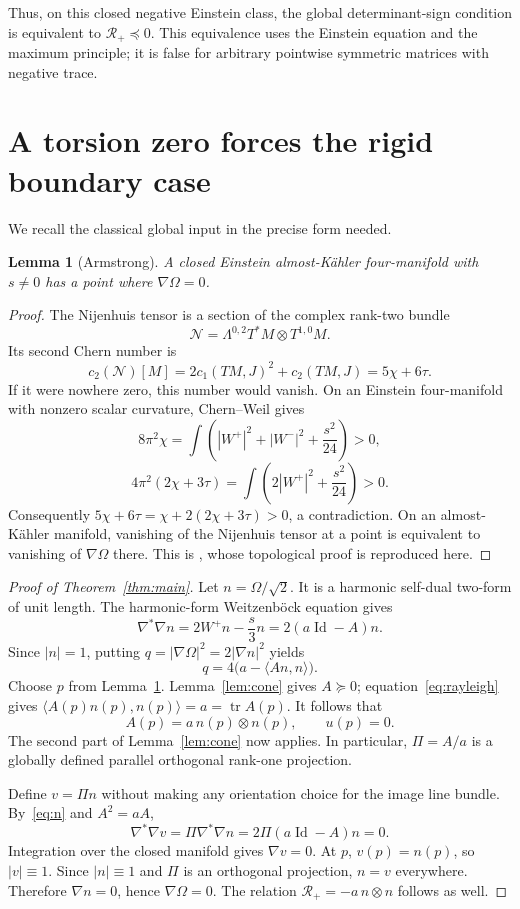 \documentclass[11pt]{article}
\newtheorem{lemma}[theorem]{Lemma}
\theoremstyle{remark}\newtheorem{remark}[theorem]{Remark}
\newcommand{\tr}{\operatorname{tr}}
\newcommand{\Id}{\operatorname{Id}}
\newcommand{\RR}{\mathcal R_+}
\begin{document}
Thus, on this closed negative Einstein class, the global determinant-sign
condition is equivalent to $\RR\preceq0$. This equivalence uses the
Einstein equation and the maximum principle; it is false for arbitrary
pointwise symmetric matrices with negative trace.

\section{A torsion zero forces the rigid boundary case}
We recall the classical global input in the precise form needed.

\begin{lemma}[Armstrong]\label{lem:zero}
A closed Einstein almost-K\"ahler four-manifold with $s\ne0$ has a point
where $\nabla\Omega=0$.
\end{lemma}
\begin{proof}
The Nijenhuis tensor is a section of the complex rank-two bundle
\[
 \mathcal N=\Lambda^{0,2}T^*M\otimes T^{1,0}M.
\]
Its second Chern number is
\[
 c_2(\mathcal N)[M]=2c_1(TM,J)^2+c_2(TM,J)=5\chi+6\tau.
\]
If it were nowhere zero, this number would vanish. On an Einstein
four-manifold with nonzero scalar curvature, Chern--Weil gives
\[
 8\pi^2\chi=\int\left(|W^+|^2+|W^-|^2+\frac{s^2}{24}\right)>0,
\]
\[
 4\pi^2(2\chi+3\tau)=\int\left(2|W^+|^2+\frac{s^2}{24}\right)>0.
\]
Consequently $5\chi+6\tau=\chi+2(2\chi+3\tau)>0$, a contradiction.
On an almost-K\"ahler manifold, vanishing of the Nijenhuis tensor at a point
is equivalent to vanishing of $\nabla\Omega$ there. This is
\cite[Theorem 2.2.4]{Armstrong}, whose topological proof is reproduced here.
\end{proof}

\begin{proof}[Proof of Theorem~\ref{thm:main}]
Let $n=\Omega/\sqrt2$. It is a harmonic self-dual two-form of unit length.
The harmonic-form Weitzenb\"ock equation gives
\begin{equation}\label{eq:n}
 \nabla^*\nabla n=2W^+n-\frac s3n=2(a\Id-A)n.
\end{equation}
Since $|n|=1$, putting $q=|\nabla\Omega|^2=2|\nabla n|^2$ yields
\begin{equation}\label{eq:rayleigh}
                     q=4\bigl(a-\langle An,n\rangle\bigr).
\end{equation}
Choose $p$ from Lemma~\ref{lem:zero}. Lemma~\ref{lem:cone} gives $A\succeq0$;
equation~\eqref{eq:rayleigh} gives
$\langle A(p)n(p),n(p)\rangle=a=\tr A(p)$.
It follows that
\[
 A(p)=a\,n(p)\otimes n(p),\qquad u(p)=0.
\]
The second part of Lemma~\ref{lem:cone} now applies. In particular,
$\Pi=A/a$ is a globally defined parallel orthogonal rank-one projection.

Define $v=\Pi n$ without making any orientation choice for the image line
bundle. By~\eqref{eq:n} and $A^2=aA$,
\[
 \nabla^*\nabla v=\Pi\nabla^*\nabla n
                =2\Pi(a\Id-A)n=0.
\]
Integration over the closed manifold gives $\nabla v=0$.
At $p$, $v(p)=n(p)$, so $|v|\equiv1$. Since $|n|\equiv1$ and $\Pi$ is an
orthogonal projection, $n=v$ everywhere. Therefore $\nabla n=0$, hence
$\nabla\Omega=0$. The relation $\RR=-a\,n\otimes n$ follows as well.
\end{proof}
\end{document}
